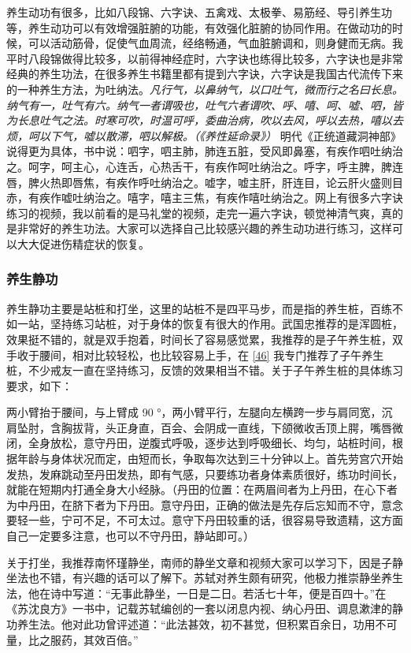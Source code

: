 养生动功有很多，比如八段锦、六字诀、五禽戏、太极拳、易筋经、导引养生功等，养生动功可以有效增强脏腑的功能，有效强化脏腑的协同作用。在做动功的时候，可以活动筋骨，促使气血周流，经络畅通，气血脏腑调和，则身健而无病。我平时八段锦做得比较多，以前得神经症时，六字诀也练得比较多，六字诀也是非常经典的养生功法，在很多养生书籍里都有提到六字诀，六字诀是我国古代流传下来的一种养生方法，为吐纳法。\textit{凡行气，以鼻纳气，以口吐气，微而行之名曰长息。纳气有一，吐气有六。纳气一者谓吸也，吐气六者谓吹、呼、嘻、呵、嘘、呬，皆为长息吐气之法。时寒可吹，时温可呼，委曲治病，吹以去风，呼以去热，嘻以去烦，呵以下气，嘘以散滞，呬以解极。（《养性延命录》）} 明代《正统道藏洞神部》说得更为具体，书中说：呬字，呬主肺，肺连五脏，受风即鼻塞，有疾作呬吐纳治之。呵字，呵主心，心连舌，心热舌干，有疾作呵吐纳治之。呼字，呼主脾，脾连唇，脾火热即唇焦，有疾作呼吐纳治之。嘘字，嘘主肝，肝连目，论云肝火盛则目赤，有疾作嘘吐纳治之。嘻字，嘻主三焦，有疾作嘻吐纳治之。网上有很多六字诀练习的视频，我以前看的是马礼堂的视频，走完一遍六字诀，顿觉神清气爽，真的是非常好的养生功法。大家可以选择自己比较感兴趣的养生动功进行练习，这样可以大大促进伤精症状的恢复。

\subsubsection{养生静功}

养生静功主要是站桩和打坐，这里的站桩不是四平马步，而是指的养生桩，百练不如一站，坚持练习站桩，对于身体的恢复有很大的作用。武国忠推荐的是浑圆桩，效果挺不错的，就是双手抱着，时间长了容易感觉累，我推荐的是子午养生桩，双手收于腰间，相对比较轻松，也比较容易上手，在 \ref{46} 我专门推荐了子午养生桩，不少戒友一直在坚持练习，反馈的效果相当不错。关于子午养生桩的具体练习要求，如下：

两小臂抬于腰间，与上臂成 90 \unit{\degree}，两小臂平行，左腿向左横跨一步与肩同宽，沉肩坠肘，含胸拔背，头正身直，百会、会阴成一直线，下颌微收舌顶上腭，嘴唇微闭，全身放松，意守丹田，逆腹式呼吸，逐步达到呼吸细长、均匀，站桩时间，根据年龄与身体状况而定，由短而长，争取每次达到三十分钟以上。首先劳宫穴开始发热，发麻跳动至丹田发热，即有气感，只要练功者身体素质很好，练功时间长，就能在短期内打通全身大小经脉。（丹田的位置：在两眉间者为上丹田，在心下者为中丹田，在脐下者为下丹田。意守丹田，正确的做法是先存后忘知而不守，意念要轻一些，宁可不足，不可太过。意守下丹田较重的话，很容易导致遗精，这方面自己一定要多注意，也可以不守丹田，静站即可。）

关于打坐，我推荐南怀瑾静坐，南师的静坐文章和视频大家可以学习下，因是子静坐法也不错，有兴趣的话可以了解下。苏轼对养生颇有研究，他极力推崇静坐养生法，他在诗中写道：“无事此静坐，一日是二日。若活七十年，便是百四十。”在《苏沈良方》一书中，记载苏轼编创的一套以闭息内视、纳心丹田、调息漱津的静功养生法。他对此功曾评述道：“此法甚效，初不甚觉，但积累百余日，功用不可量，比之服药，其效百倍。”

